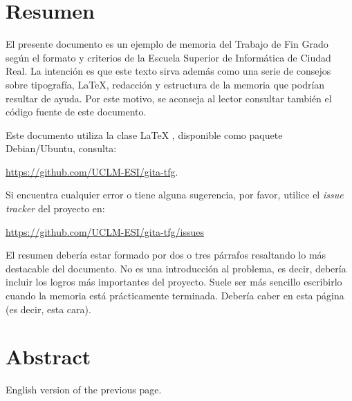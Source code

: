 \chapter{Resumen}

El presente documento es un ejemplo de memoria del Trabajo de Fin Grado según el
formato y criterios de la Escuela Superior de Informática de Ciudad Real. La
intención es que este texto sirva además como una serie de consejos sobre
tipografía, \LaTeX, redacción y estructura de la memoria que podrían resultar de
ayuda. Por este motivo, se aconseja al lector consultar también el código fuente
de este documento.

Este documento utiliza la clase \LaTeX{} \gitatfg{}, disponible como paquete
Debian/Ubuntu, consulta:

 \url{https://github.com/UCLM-ESI/gita-tfg}.

Si encuentra cualquier error o tiene alguna sugerencia, por favor, utilice
el \emph{issue tracker} del proyecto \gitatfg{} en:

\url{https://github.com/UCLM-ESI/gita-tfg/issues}

El resumen debería estar formado por dos o tres párrafos resaltando lo más
destacable del documento. No es una introducción al problema, es decir, debería
incluir los logros más importantes del proyecto. Suele ser más sencillo
escribirlo cuando la memoria está prácticamente terminada. Debería caber en esta
página (es decir, esta cara).


\chapter{Abstract}

English version of the previous page.
